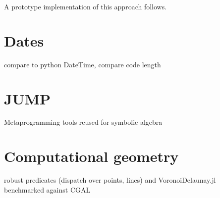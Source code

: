 A prototype implementation of this approach follows.



\section{Dates}

compare to python DateTime, compare code length


\section{JUMP}

Metaprogramming tools reused for symbolic algebra


\section{Computational geometry}

robust predicates (dispatch over points, lines) and VoronoiDelaunay.jl
benchmarked against CGAL




